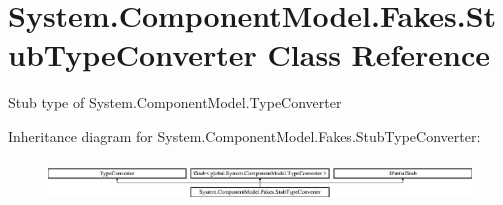 \hypertarget{class_system_1_1_component_model_1_1_fakes_1_1_stub_type_converter}{\section{System.\-Component\-Model.\-Fakes.\-Stub\-Type\-Converter Class Reference}
\label{class_system_1_1_component_model_1_1_fakes_1_1_stub_type_converter}
}


Stub type of System.\-Component\-Model.\-Type\-Converter 


Inheritance diagram for System.\-Component\-Model.\-Fakes.\-Stub\-Type\-Converter\-:\begin{figure}[H]
\begin{center}
\leavevmode
\includegraphics[height=1.094819cm]{class_system_1_1_component_model_1_1_fakes_1_1_stub_type_converter}
\end{center}
\end{figure}
